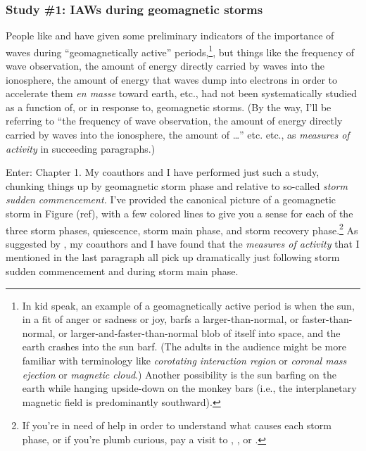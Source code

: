 \subsubsection{Study \#1: IAWs during geomagnetic storms}

People like \citet{Chaston2007} and \citet{Newell2009} have given some
preliminary indicators of the importance of \Alf waves during ``geomagnetically
active'' periods,\footnote{In kid speak, an example of a geomagnetically active
  period is when the sun, in a fit of anger or sadness or joy, barfs a
  larger-than-normal, or faster-than-normal, or larger-and-faster-than-normal
  blob of itself into space, and the earth crashes into the sun barf. (The
  adults in the audience might be more familiar with terminology like
  \emph{corotating interaction region} or \emph{coronal mass ejection} or
  \emph{magnetic cloud}.) Another possibility is the sun barfing on the earth
  while hanging upside-down on the monkey bars (i.e., the interplanetary
  magnetic field is predominantly southward).}, but things like the frequency of
\Alf wave observation, the amount of energy directly carried by \Alf waves into
the ionosphere, the amount of energy that \Alf waves dump into electrons in
order to accelerate them \textit{en masse} toward earth, etc., had not been
systematically studied as a function of, or in response to, geomagnetic
storms. (By the way, I'll be referring to ``the frequency of \Alf wave
observation, the amount of energy directly carried by \Alf waves into the
ionosphere, the amount of \dots'' etc. etc., as \emph{measures of \Alfic
  activity} in succeeding paragraphs.)

Enter: Chapter 1. My coauthors and I have performed just such a study, chunking
things up by geomagnetic storm phase and relative to so-called \emph{storm
  sudden commencement.} I've provided the canonical picture of a geomagnetic
storm in Figure (ref), with a few colored lines to give you a sense for each of
the three storm phases, quiescence, storm main phase, and storm recovery
phase.\footnote{If you're in need of help in order to understand what causes
  each storm phase, or if you're plumb curious, pay a visit to
  \citet{Gonzalez1994}, \citet{Denton2006}, or \citet{Lakhina2008}.} As
suggested by \citet{Chaston2007}, my coauthors and I have found that the
\emph{measures of \Alfic activity} that I mentioned in the last paragraph all
pick up dramatically just following storm sudden commencement and during storm
main phase.


